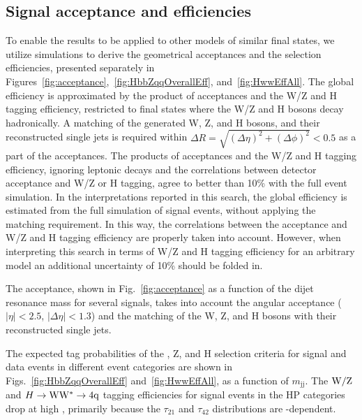 \subsection{Signal acceptance and efficiencies}


To enable the results  
to be applied to other models of similar final states, 
we utilize simulations to derive the geometrical acceptances
and the selection efficiencies, presented separately in 
Figures~\ref{fig:acceptance},~\ref{fig:HbbZqqOverallEff}, and~\ref{fig:HwwEffAll}.
The global efficiency is 
approximated by the product of acceptances and 
the W/Z and H tagging efficiency, restricted
to final states where the W/Z and H bosons decay 
hadronically. A matching 
of the generated
W, Z, and H bosons, and their
reconstructed single jets
is required within
$\Delta R = \sqrt{(\Delta\eta)^2 + (\Delta\phi)^2} < 0.5$ 
as a part of the acceptances. 
The products of acceptances and the W/Z and H tagging efficiency, 
ignoring leptonic decays and the correlations between
detector acceptance and W/Z or H tagging, 
agree to better than 10\% with the full event simulation.
In the interpretations reported in this search,
the global efficiency is estimated from the full simulation
of signal events, without applying the matching requirement.
In this way, the correlations
between the acceptance and W/Z and H tagging efficiency 
are properly taken into account.
However, when interpreting this search in terms of 
W/Z and H tagging efficiency for an arbitrary model 
an additional uncertainty of 10\% should be folded in. 

The acceptance, shown in Fig.~\ref{fig:acceptance} 
as a function of the dijet resonance mass for several
signals, takes into account the angular 
acceptance ($|\eta| < 2.5$, $|\Delta\eta|<1.3$)
and the matching of the W, Z, and H 
bosons with their reconstructed single jets.


The expected tag probabilities of the \PW, Z, and H selection 
criteria for
signal and data events in different event categories are shown
in Figs.~\ref{fig:HbbZqqOverallEff} and~\ref{fig:HwwEffAll},
 as a function of $m_\mathrm{jj}$. 
The ${\rm W}/{\rm Z}$ and $H\to{\rm W}{\rm W}^*\to4{\rm q}$ tagging efficiencies 
for signal events in the HP categories
drop at high \pt, %
primarily because the $\tau_{21}$ and $\tau_{42}$ 
 distributions are \pt-dependent.



